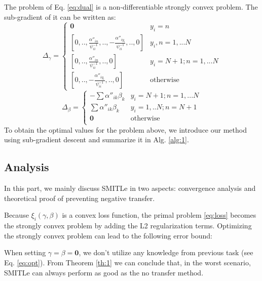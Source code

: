 The problem of Eq. \eqref{eq:dual} is a non-differentiable strongly convex problem. The sub-gradient of it can be written as:
\begin{equation*}
{\Delta _\gamma }=\begin{cases}
\boldsymbol{0}&{y_i}=n\\
\left[ {0,..,\frac{{\alpha ''}_{in}}{\psi _{ii}^{ - 1}},.., - \frac{{\alpha ''}_{i{y_i}}}{\psi _{ii}^{ - 1}},..,0} \right]&{y_i},n = 1,...N\\
\left[ {0,..,\frac{{\alpha ''}_{in}}{\psi _{ii}^{ - 1}},..,0} \right]&{y_i} = N + 1;n = 1,...N\\
\left[ {0,.., - \frac{{\alpha ''}_{i{y_i}}}{\psi _{ii}^{ - 1}},..,0} \right]&\text{otherwise}
\end{cases}
\end{equation*}
\begin{equation*}
{\Delta _\beta }=\begin{cases}
 - \sum {{{\alpha ''}_{ik}}{\beta _k}} &{y_i} = N + 1;n = 1,...N\\
 \sum {{{\alpha ''}_{ik}}{\beta _k}} &{y_i} = 1,..N;n = N+1\\
\boldsymbol{0}&\text{otherwise}\\
\end{cases}
\end{equation*}
To obtain the optimal values for the problem above, we introduce our method using sub-gradient descent \cite{BoydCO} and summarize it in Alg. \ref{alg:1}. 


\subsection{Analysis}\label{subsec:analysis}
In this part, we mainly discuss SMITLe in two aspects: convergence analysis and theoretical proof of preventing negative transfer.

Because $\xi_i(\gamma,\beta)$ is a convex loss function, the primal problem \eqref{eq:loss} becomes the strongly convex problem by adding the L2 regularization terms. Optimizing the strongly convex problem can lead to the following error bound:



When setting $\gamma=\beta = \mathbf{0}$, we don't utilize any knowledge from previous task (see Eq. \eqref{eq:opt}). From Theorem \ref{th:1} we can conclude that, in the worst scenario, SMITLe can always perform as good as the no transfer method.

